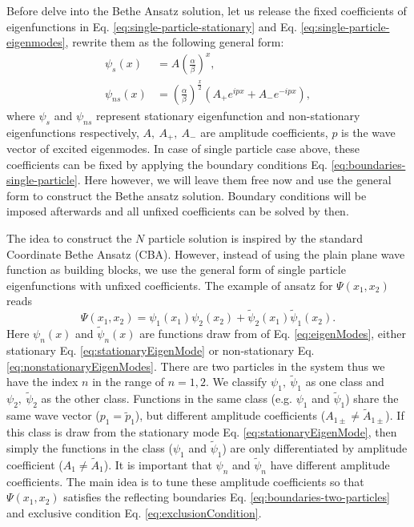 Before delve into the Bethe Ansatz solution, let us release the fixed coefficients of eigenfunctions in Eq. \eqref{eq:single-particle-stationary} and Eq. \eqref{eq:single-particle-eigenmodes}, rewrite them as the following general form:
\begin{subequations}
    \label{eq:eigenModes}
\begin{align}
    \label{eq:stationaryEigenMode}
    \psi_s(x)  & =  A\left(\frac{\alpha}{\beta}\right)^x, \\
    \label{eq:nonstationaryEigenModes}
    \psi_{ns}(x) & =  \left(\frac{\alpha}{\beta}\right)^{\frac{x}{2}} \left(A_+ e^{ipx} +  A_-e^{-ipx}\right),
\end{align}
\end{subequations}
where $\psi_s$ and $\psi_{ns}$ represent stationary eigenfunction and non-stationary eigenfunctions respectively, $A,~A_+,~A_-$ are amplitude coefficients, $p$ is the wave vector of excited eigenmodes. In case of single particle case above, these coefficients can be fixed by applying the boundary conditions Eq. \eqref{eq:boundaries-single-particle}. Here however, we will leave them free now and use the general form to construct the Bethe ansatz solution. Boundary conditions will be imposed afterwards and all unfixed coefficients can be solved by then. 

The idea to construct the $N$ particle solution is inspired by the standard Coordinate Bethe Ansatz (CBA). However, instead of using the plain plane wave function as building blocks, we use the general form of single particle eigenfunctions with unfixed coefficients. The example of ansatz for $\Psi(x_1, x_2)$ reads
\begin{equation}
    \label{eq:ansatzTwo}
    \Psi(x_1, x_2) = \psi_1(x_1)\psi_2(x_2) + \tilde{\psi}_2(x_1)\tilde{\psi}_1(x_2).
\end{equation}
Here $\psi_n(x)$ and $\tilde{\psi}_n(x)$ are functions draw from of Eq. \eqref{eq:eigenModes}, either stationary Eq. \eqref{eq:stationaryEigenMode} or non-stationary Eq.\eqref{eq:nonstationaryEigenModes}. There are two particles in the system thus we have the index $n$ in the range of $n=1,2$. 
We classify $\psi_1, ~\tilde{\psi}_1$ as one class and $\psi_2,~\tilde{\psi}_2$ as the other class. Functions in the same class (e.g. $\psi_1$ and $\tilde{\psi}_1$) share the same wave vector ($p_1=\tilde{p}_1$), but different amplitude coefficients ($A_{1\pm}\neq \tilde{A}_{1\pm}$). If this class is draw from the stationary mode Eq. \eqref{eq:stationaryEigenMode}, then simply the functions in the class ($\psi_1$ and $\tilde{\psi}_1$) are only differentiated by amplitude coefficient ($A_1\neq\tilde{A}_1$). 
It is important that $\psi_n$ and $\tilde{\psi}_n$ have different amplitude coefficients. The main idea is to tune these amplitude coefficients so that $\Psi(x_1, x_2)$ satisfies the reflecting boundaries Eq. \eqref{eq:boundaries-two-particles} and exclusive condition Eq. \eqref{eq:exclusionCondition}.  

